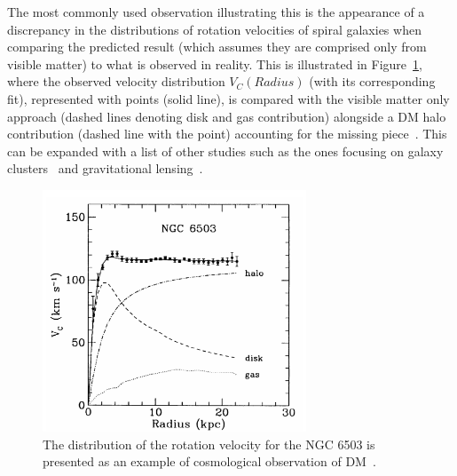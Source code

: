 \hspace{10pt} The most commonly used observation illustrating this is the appearance of a discrepancy in the distributions of rotation velocities of spiral galaxies when comparing the predicted result (which assumes they are comprised only from visible matter) to what is observed in reality. This is illustrated in Figure~\ref{fig:DM}, where the observed velocity distribution $V_C(Radius)$ (with its corresponding fit), represented with points (solid line), is compared with the visible matter only approach (dashed lines denoting disk and gas contribution) alongside a DM halo contribution (dashed line with the point) accounting for the missing piece~\cite{paper:dm_vc}. This can be expanded with a list of other studies such as the ones focusing on galaxy clusters~\cite{paper:dm_gal_clust} and gravitational lensing~\cite{paper:dm_grav_lens}.

\begin{figure}[htbp]
    \begin{center}
        \includegraphics[width=0.7\textwidth]{Theory/DM_velocity.png}
        \caption{The distribution of the rotation velocity for the NGC 6503 is presented as an example of cosmological observation of DM~\cite{paper:dm_vc}.}
      \label{fig:DM} 
    \end{center}
  \end{figure}



